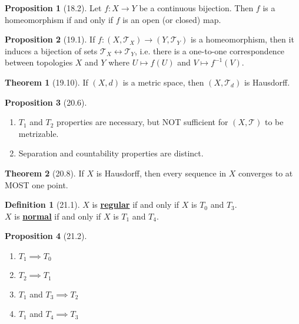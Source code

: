 \documentclass{article}
\newcommand{\Iff}{if and only if}
\newcommand{\define}[1]{\textbf{\underline{#1}}}
\newcommand{\func}[3]{\ensuremath{#1: #2 \to #3}}
\newcommand{\tp}{\ensuremath{\mathscr{T}}}
\newcommand{\Ts}[2]{\ensuremath{(#1,#2)}}
\theoremstyle{definition}
\newtheorem*{defn}{Definition}
\newtheorem*{thm}{Theorem}
\newtheorem*{prop}{Proposition}
\theoremstyle{remark}
\begin{document}
{        \begin{prop}[18.2]
            Let $\func{f}{X}{Y}$ be a continuous bijection. Then $f$ is a homeomorphism \Iff{} $f$ is an open (or closed) map.
        \end{prop}
        
        \begin{prop}[19.1]
            If $\func{f}{\Ts{X}{\tp_X}}{\Ts{Y}{\tp_Y}}$ is a homeomorphism, then it induces a bijection of sets $\tp_X \leftrightarrow \tp_Y$, i.e. there is a one-to-one correspondence between topologies $X$ and $Y$ where $U \mapsto f(U)$ and $V \mapsto f^{-1}(V)$.
        \end{prop}
        
        \begin{thm}[19.10]
            If $\Ts{X}{d}$ is a metric space, then $\Ts{X}{\tp_d}$ is Hausdorff.
        \end{thm}
        
        \begin{prop}[20.6]\hfill
            \begin{enumerate}
                \item $T_1$ and $T_2$ properties are necessary, but NOT sufficient for $\Ts{X}{\tp}$ to be metrizable.
                \item Separation and countability properties are distinct.
            \end{enumerate}
        \end{prop}
        
        \begin{thm}[20.8]
            If $X$ is Hausdorff, then every sequence in $X$ converges to at MOST one point.
        \end{thm}
        
        \begin{defn}[21.1]
            $X$ is \define{regular} \Iff{} $X$ is $T_0$ and $T_3$.\\
            $X$ is \define{normal} \Iff{} $X$ is $T_1$ and $T_4$.
        \end{defn}
        
        \begin{prop}[21.2]\hfill
            \begin{enumerate}
                \item $T_1 \implies T_0$
                \item $T_2 \implies T_1$
                \item $T_1$ and $T_3 \implies T_2$
                \item $T_1$ and $T_4 \implies T_3$
            \end{enumerate}
        \end{prop}
        
}
\end{document}
